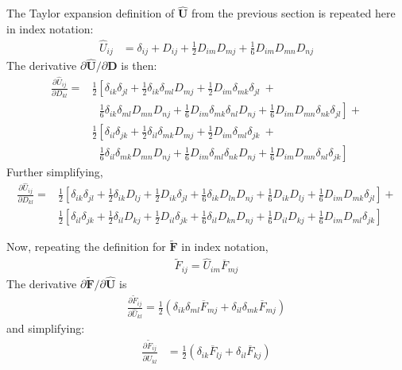 The Taylor expansion definition of $\hat{\bm U}$ from the previous section is repeated here in index notation:
\begin{align}
\hat{U}_{ij} &= \delta_{ij} + D_{ij} + \frac{1}{2}D_{im}D_{mj} + \frac{1}{6}D_{im}D_{mn}D_{nj}
\end{align}
The derivative $\partial \hat{\bm U}/{\partial {\bm D}}$ is then:
\begin{equation}
\begin{split}
\frac{\partial \hat{U}_{ij}}{\partial D_{kl}} = &\frac{1}{2}\left[\delta_{ik}\delta_{jl} + \frac{1}{2}\delta_{ik}\delta_{ml}D_{mj} + \frac{1}{2}D_{im}\delta_{mk}\delta_{jl}\  + \right.\\
&\ \left.\ \ \frac{1}{6}\delta_{ik}\delta_{ml}D_{mn}D_{nj} + \frac{1}{6}D_{im}\delta_{mk}\delta_{nl}D_{nj} + \frac{1}{6}D_{im}D_{mn}\delta_{nk}\delta_{jl}\right] + \\
&\frac{1}{2}\left[\delta_{il}\delta_{jk} + \frac{1}{2}\delta_{il}\delta_{mk}D_{mj} + \frac{1}{2}D_{im}\delta_{ml}\delta_{jk}\  + \right.\\
&\ \left.\ \ \frac{1}{6}\delta_{il}\delta_{mk}D_{mn}D_{nj} + \frac{1}{6}D_{im}\delta_{ml}\delta_{nk}D_{nj} + \frac{1}{6}D_{im}D_{mn}\delta_{nl}\delta_{jk}\right]
\end{split}
\end{equation}
Further simplifying,
\begin{align}
\frac{\partial \hat{U}_{ij}}{\partial D_{kl}} = &\frac{1}{2}\left[\delta_{ik}\delta_{jl} + \frac{1}{2}\delta_{ik}D_{lj} + \frac{1}{2}D_{ik}\delta_{jl} + \frac{1}{6}\delta_{ik}D_{ln}D_{nj} + \frac{1}{6}D_{ik}D_{lj} + \frac{1}{6}D_{im}D_{mk}\delta_{jl}\right] + \\
&\frac{1}{2}\left[\delta_{il}\delta_{jk} + \frac{1}{2}\delta_{il}D_{kj} + \frac{1}{2}D_{il}\delta_{jk} + \frac{1}{6}\delta_{il}D_{kn}D_{nj} + \frac{1}{6}D_{il}D_{kj} + \frac{1}{6}D_{im}D_{ml}\delta_{jk}\right]
\end{align}

Now, repeating the definition for $\tilde {\bm F}$ in index notation,
\begin{align}
\tilde{F}_{ij} = \hat{U}_{im}\overline{F}_{mj}
\end{align}
The derivative ${\partial \tilde{\bm F}}/{\partial \hat{\bm U}}$ is
\begin{align}
\frac{\partial \tilde{F}_{ij}}{\partial \hat{U}_{kl}} = \frac{1}{2}\left(\delta_{ik}\delta_{ml}\overline{F}_{mj} + \delta_{il}\delta_{mk}\overline{F}_{mj}\right)
\end{align}
and simplifying:
\begin{align}
\frac{\partial \tilde{F}_{ij}}{\partial \hat{U}_{kl}} &= \frac{1}{2}\left(\delta_{ik}\overline{F}_{lj} + \delta_{il}\overline{F}_{kj}\right)
\end{align}

